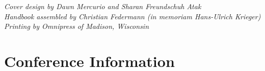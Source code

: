 \documentclass[twoside,makeidx]{book}
\begin{document}


\fancyfoot[C]{}




\thispagestyle{empty}
\vspace*{6in}
\noindent\emph{Cover design by Dawn Mercurio and Sharan Freundschuh Atak}\\
\noindent\emph{Handbook assembled by Christian Federmann (\emph{\color{red}in memoriam Hans-Ulrich Krieger})}\\
\emph{Printing by Omnipress of Madison, Wisconsin}

\newpage
\cleardoublepage
\fancyfoot[C]{\thepage}
\frontmatter





\setcounter{tocdepth}{2}
\tableofcontents
\mainmatter
\pagestyle{fancy}


\clearpage


\chapter{Conference Information}


\clearpage


\clearpage%
\setheaders{}{}


%
\clearpage%
\setheaders{}{}
\end{document}
